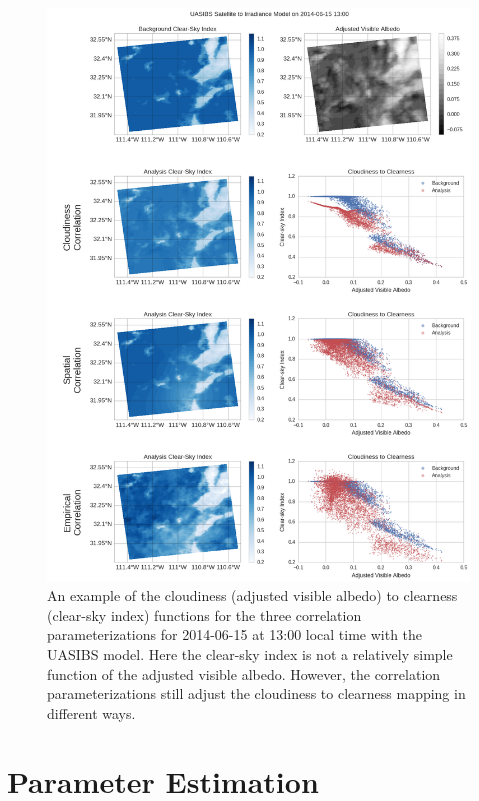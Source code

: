\begin{figure}[p]
\centering
\includegraphics[width=\textwidth]{figs/cld_to_clear_UASIBS_2014-06-15.png}
\caption[Clearness versus Cloudiness for UASIBS on 6/15]{An example
  of the cloudiness (adjusted visible albedo) to clearness (clear-sky
  index) functions for the three correlation parameterizations for
  2014-06-15 at 13:00 local time with the UASIBS model. Here the
  clear-sky index is not a relatively simple function of the adjusted
  visible albedo. However, the correlation parameterizations still
  adjust the cloudiness to clearness mapping in different ways.}
\label{fig:cldclr_ua_615}
\end{figure}


\section{Parameter Estimation}
\label{sec:paramopt}

